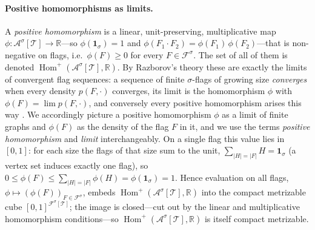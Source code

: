 \documentclass[11pt]{article}
\theoremstyle{definition}
\newcommand{\R}{\mathbb{R}}
\newcommand{\A}{\mathcal{A}}
\newcommand{\F}{\mathcal{F}}
\newcommand{\T}{\mathcal{T}}
\newcommand{\Homp}{\operatorname{Hom}^{+}}
\newcommand{\one}{\mathbf 1}
\begin{document}
\paragraph{Positive homomorphisms as limits.}
A \emph{positive homomorphism} is a linear, unit-preserving, multiplicative map
$\phi:\A^\sigma[\T]\to\R$---so $\phi(\one_\sigma)=1$ and
$\phi(F_1\cdot F_2)=\phi(F_1)\,\phi(F_2)$---that is non-negative on flags, i.e.\
$\phi(F)\ge0$ for every $F\in\F^\sigma$.  The set of all of them is denoted
$\Homp(\A^\sigma[\T],\R)$.  By Razborov's theory these are exactly the limits of
convergent flag sequences: a sequence of finite $\sigma$-flags of growing size
\emph{converges} when every density $p(F,\cdot)$ converges, its limit is the homomorphism
$\phi$ with $\phi(F)=\lim p(F,\cdot)$, and conversely every positive homomorphism arises
this way \cite[Theorem 3.3]{Razborov2007}.  We accordingly picture a positive homomorphism
$\phi$ as a limit of finite graphs and $\phi(F)$ as the density of the flag $F$ in it, and
we use the terms \emph{positive homomorphism} and \emph{limit} interchangeably.  On a single
flag this value lies in $[0,1]$: for each size the flags of that size sum to the unit,
$\sum_{|H|=|F|}H=\one_\sigma$ (a vertex set induces exactly one flag), so
$0\le\phi(F)\le\sum_{|H|=|F|}\phi(H)=\phi(\one_\sigma)=1$.  Hence evaluation on all flags,
$\phi\mapsto(\phi(F))_{F\in\F^\sigma}$, embeds $\Homp(\A^\sigma[\T],\R)$ into the compact
metrizable cube $[0,1]^{\F^\sigma[\T]}$; the image is closed---cut out by the linear and
multiplicative homomorphism conditions---so $\Homp(\A^\sigma[\T],\R)$ is itself compact
metrizable.
\end{document}
